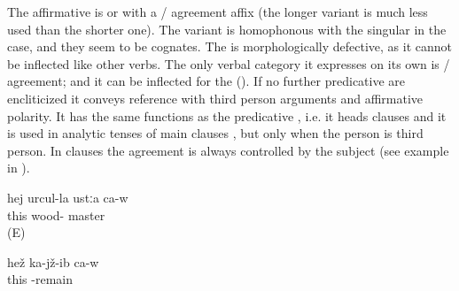 The affirmative  is  or  with a / agreement affix (the longer variant is much less used than the shorter one). The variant  is homophonous with the singular  in the  case, and they seem to be cognates. The  is morphologically defective, as it cannot be inflected like other verbs. The only verbal category it expresses on its own is / agreement; and it can be inflected for the  (). If no further predicative  are encliticized it conveys  reference with third person arguments and affirmative polarity. It has the same functions as the predicative , i.e. it heads  clauses  and it is used in analytic tenses of main clauses , but only when the person  is third person. In  clauses the agreement is always controlled by the subject (see example  in ).
%
\begin{exe}
	\ex	\label{ex:He is a carpenter}
	\gll	hej	urcul-la	ustːa	ca-w\\
		this	wood-	master	\\
	\glt	{} (E)

	\ex	\label{ex:He is sitting}
	\gll	hež	ka-jž-ib	ca-w\\
		this	-remain	\\
	\glt	{}
\end{exe}

